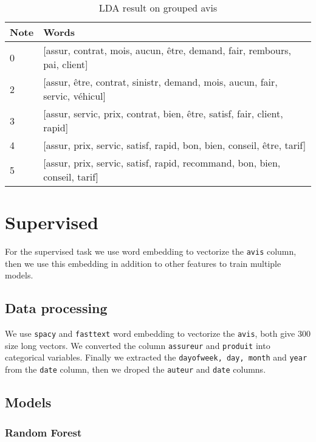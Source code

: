 \documentclass[a4paper, 12pt, one column]{article}
\begin{document}
\begin{table}[H]
\centering
\begin{tabular}{|p{1cm}|p{13cm}|}
\hline
\textbf{Note} & \textbf{Words} \\
\hline
    0 &    [assur, contrat, mois, aucun, être, demand, fair, rembours, pai, client] \\
    2 & [assur, être, contrat, sinistr, demand, mois, aucun, fair, servic, véhicul] \\
    3 &     [assur, servic, prix, contrat, bien, être, satisf, fair, client, rapid] \\
    4 &       [assur, prix, servic, satisf, rapid, bon, bien, conseil, être, tarif] \\
    5 &  [assur, prix, servic, satisf, rapid, recommand, bon, bien, conseil, tarif] \\
\hline
\end{tabular}
\label{tab:unsupervised_split}
\caption{LDA result on grouped avis}
\end{table}

\newpage
\section{Supervised}

For the supervised task we use word embedding to vectorize the \lstinline{avis} column, then we use this embedding in addition to other features to train multiple models.

\subsection{Data processing}

We use \lstinline{spacy} and \lstinline{fasttext} word embedding to vectorize the \lstinline{avis}, both give 300 size long vectors.
We converted the column \lstinline{assureur} and \lstinline{produit} into categorical variables.
Finally we extracted the \lstinline{dayofweek, day, month} and \lstinline{year} from the \lstinline{date} column, then we droped the \lstinline{auteur} and \lstinline{date} columns.

\subsection{Models}

\subsubsection{Random Forest}
\end{document}
